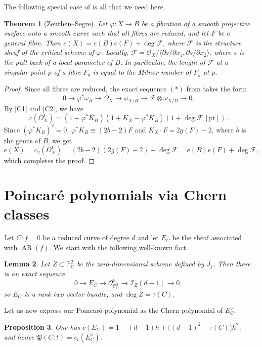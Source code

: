\documentclass[11pt]{amsart}
\newtheorem{theorem}{Theorem}[section]
\newtheorem{proposition}[theorem]{Proposition}
\newtheorem{lemma}[theorem]{Lemma}
\theoremstyle{definition}
\numberwithin{equation}{section}
\newcommand{\PP}{\mathbb{P}}
\newcommand{\CC}{\mathbb{C}}
\newcommand{\cO}{\mathcal{O}}
\newcommand{\cF}{\mathcal{F}}
\newcommand{\cI}{\mathcal{I}}
\newcommand{\Pfrak}{\mathfrak{P}}
\newcommand{\pt}{\mathrm{pt}}
\DeclareMathOperator{\AR}{AR}
\begin{document}
The following special case of \cite[Theorem~1.33]{BCP} is all that we need here.

\begin{theorem}[Zeuthen--Segre]\label{thm:ZS}
Let $\varphi\colon X\to B$ be a fibration of a smooth projective surface onto a smooth curve such that all fibres are reduced, and let $F$ be a general fibre.
Then $e(X)=e(B)e(F)+\deg\cF$, where $\cF$ is the structure sheaf of the critical scheme of $\varphi$.
Locally, $\cF=\cO_X/\langle\partial s/\partial x_1,\partial s/\partial x_2\rangle$, where $s$ is the pull-back of a local parameter of $B$.
In particular, the length of $\cF$ at a singular point $p$ of a fibre $F_y$ is equal to the Milnor number of $F_y$ at $p$.
\end{theorem}

\begin{proof}
Since all fibres are reduced, the exact sequence $(*)$ from \cite[p.~28]{BCP} takes the form
\[
0\to\varphi^*\omega_B\to\Omega^1_X\to\omega_{X/B}\to\cF\otimes\omega_{X/B}\to0 .
\]
By \ref{C1} and \ref{C2}, we have
\[
c(\Omega^1_X)=(1+\varphi^*K_B)(1+K_X-\varphi^*K_B)(1+\deg\cF\,[\pt]).
\]
Since $(\varphi^*K_B)^2=0$, $\varphi^*K_B\equiv(2b-2)F$ and $K_X\cdot F=2g(F)-2$, where $b$ is the genus of $B$, we get
\[
e(X)=c_2(\Omega^1_X)=(2b-2)(2g(F)-2)+\deg\cF=e(B)e(F)+\deg\cF,
\]
which completes the proof.
\end{proof}

\section{Poincar\'e polynomials via Chern classes}\label{sec:A}

Let $C\colon f=0$ be a reduced curve of degree $d$ and let $E_C$ be the sheaf associated with $\AR(f)$.
We start with the following well-known fact.

\begin{lemma}\label{lem:syz}
Let $Z\subset\PP^2_\CC$ be the zero-dimensional scheme defined by $J_f$. Then there is an exact sequence
\begin{equation}\label{eq:syz}
0\to E_C\to\cO^3_{\PP^2_\CC}\to\cI_Z(d-1)\to0,
\end{equation}
so $E_C$ is a rank two vector bundle, and $\deg Z=\tau(C)$.
\end{lemma}
Let us now express our Poincar\'e polynomial as the Chern polynomial of $E_{C}^{\vee}$.
\begin{proposition}\label{prop:chern}
One has $c(E_C)=1-(d-1)h+\bigl((d-1)^2-\tau(C)\bigr)h^2$, and hence $\Pfrak(C;t)=c_t(E_C^\vee)$.
\end{proposition}
\end{document}
